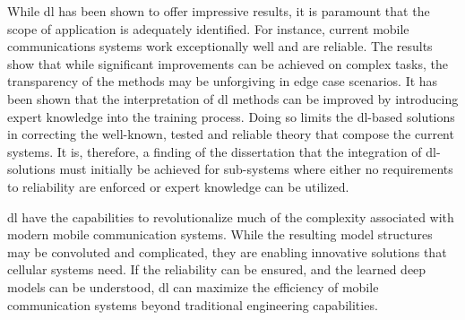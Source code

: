 While \acrlong{dl} has been shown to offer impressive results, it is paramount that the scope of application is adequately identified. For instance, current mobile communications systems work exceptionally well and are reliable. The results show that while significant improvements can be achieved on complex tasks, the transparency of the methods may be unforgiving in edge case scenarios. It has been shown that the interpretation of \acrlong{dl} methods can be improved by introducing expert knowledge into the training process. Doing so limits the \acrlong{dl}-based solutions in correcting the well-known, tested and reliable theory that compose the current systems. It is, therefore, a finding of the dissertation that the integration of \acrlong{dl}-solutions must initially be achieved for sub-systems where either no requirements to reliability are enforced or expert knowledge can be utilized. 

\acrlong{dl} have the capabilities to revolutionalize much of the complexity associated with modern mobile communication systems. While the resulting model structures may be convoluted and complicated, they are enabling innovative solutions that cellular systems need. If the reliability can be ensured, and the learned deep models can be understood, \acrlong{dl} can maximize the efficiency of mobile communication systems beyond traditional engineering capabilities.





